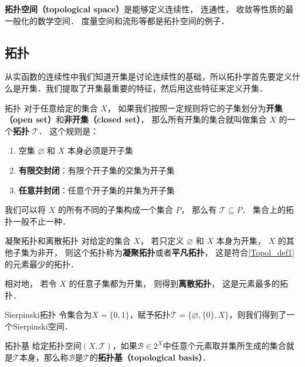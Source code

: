 

\textbf{拓扑空间（topological space）}是能够定义连续性， 连通性， 收敛等性质的最一般化的数学空间． 度量空间和流形等都是拓扑空间的例子．

\subsection{拓扑}

从实函数的连续性中我们知道开集是讨论连续性的基础，所以拓扑学首先要定义什么是开集．我们提取了开集最重要的特征，然后用这些特征来定义开集．

\begin{definition}{拓扑}\label{Topol_def1}
对于任意给定的集合 $X$， 如果我们按照一定规则将它的子集划分为\textbf{开集（open set）}和\textbf{非开集（closed set）}， 那么所有开集的集合就叫做集合 $X$ 的一个\textbf{拓扑} $\mathcal{T}$． 这个规则是：
\begin{enumerate}
\item 空集 $\varnothing$ 和 $X$ 本身必须是开子集
\item \textbf{有限交封闭}：有限个开子集的交集为开子集
\item \textbf{任意并封闭}：任意个开子集的并集为开子集
\end{enumerate}
\end{definition}

我们可以将 $X$ 的所有不同的子集构成一个集合 $P$， 那么有 $\mathcal{T} \subseteq P$． 集合上的拓扑一般不止一种．

\begin{example}{凝聚拓扑和离散拓扑}
对给定的集合 $X$， 若只定义 $\varnothing$ 和 $X$ 本身为开集， $X$ 的其他子集为非开， 则这个拓扑称为\textbf{凝聚拓扑}或者\textbf{平凡拓扑}， 这是符合\autoref{Topol_def1} 的元素最少的拓扑．

相对地， 若令 $X$ 的任意子集都为开集， 则得到\textbf{离散拓扑}， 这是元素最多的拓扑．
\end{example}

\begin{example}{Sierpinski拓扑}
令集合为$X=\{0, 1\}$，赋予拓扑$\mathcal{T}=\{\varnothing, \{0\}, X\}$，则我们得到了一个Sierpinski空间．
\end{example}

\begin{definition}{拓扑基}
给定拓扑空间$(X, \mathcal{T})$，如果$\mathcal{B}\in 2^X$中任意个元素取并集所生成的集合就是$\mathcal{T}$本身，那么称$\mathcal{B}$是$\mathcal{T}$的\textbf{拓扑基（topological basis）}．
\end{definition}

